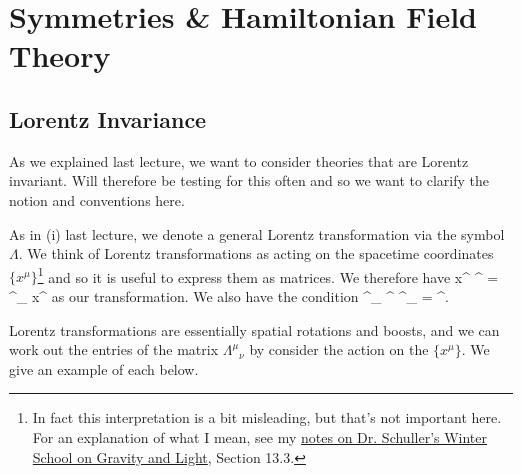 \chapter{Symmetries \& Hamiltonian Field Theory}

\section{Lorentz Invariance}

As we explained last lecture, we want to consider theories that are Lorentz invariant. Will therefore be testing for this often and so we want to clarify the notion and conventions here. 

As in (i) last lecture, we denote a general Lorentz transformation via the symbol $\Lambda$. We think of Lorentz transformations as acting on the spacetime coordinates $\{x^{\mu}\}$\footnote{In fact this interpretation is a bit misleading, but that's not important here. For an explanation of what I mean, see my \href{https://richie291.wixsite.com/theoreticalphysics/post/the-we-heraeus-international-winter-school-on-gravity-and-light}{notes on Dr. Schuller's Winter School on Gravity and Light}, Section 13.3.} and so it is useful to express them as matrices. We therefore have 
\bse 
    x^{\mu} \longrightarrow {}^{\mu} = {\Lambda^{\mu}}_{\nu} x^{\nu}
\ese 
as our transformation. We also have the condition 
\be 
\label{eqn:LorentzTransformationsOnMetric}
    {\Lambda^{\mu}}_{\tau} \eta^{\tau\sig} {\Lambda^{\nu}}_{\sig} = \eta^{\mu\nu}. 
\ee 

Lorentz transformations are essentially spatial rotations and boosts, and we can work out the entries of the matrix ${\Lambda^{\mu}}_{\nu}$ by consider the action on the $\{x^{\mu}\}$. We give an example of each below. 

